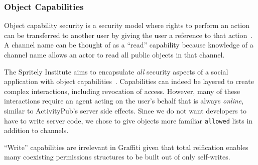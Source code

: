 
\subsubsection{Object Capabilities}
\label{related-work:ocaps}

Object capability security is a security model where rights to perform an action
can be transferred to another user by giving the user a reference to that action~\cite{capabilitymyths}.
A channel name can be thought of as a ``read'' capability because knowledge
of a channel name allows an actor to read all public objects in that channel.

The Spritely Institute aims to encapsulate \emph{all}
security aspects of a social application with object capabilities~\cite{spritely}.
Capabilities can indeed be layered to create complex interactions,
including revocation of access.
However, many of these interactions require an agent acting on the user's behalf
that is always \emph{online}, similar to ActivityPub's server side effects.
Since we do not want developers to have to write server code,
we chose to give objects more familiar \texttt{allowed} lists
in addition to channels.

``Write'' capabilities are irrelevant in Graffiti given that total reification enables many coexisting permissions structures
to be built out of only self-writes.



